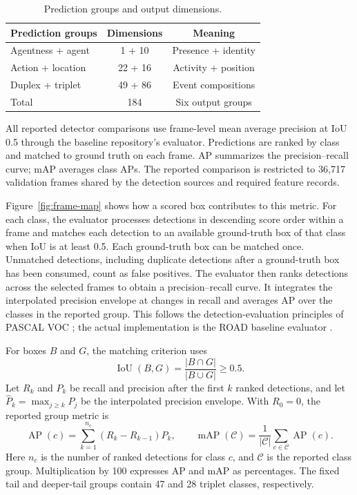 \begin{table}[htbp]
\centering
\caption{Prediction groups and output dimensions.}
\label{tab:2}
\begin{singlespace}
\begin{tabular}{@{}lcc@{}}
\toprule
\textbf{Prediction groups} & \textbf{Dimensions} & \textbf{Meaning} \\
\midrule
Agentness + agent & 1 + 10 & Presence + identity \\
Action + location & 22 + 16 & Activity + position \\
Duplex + triplet & 49 + 86 & Event compositions \\
Total & 184 & Six output groups \\
\bottomrule
\end{tabular}
\end{singlespace}
\end{table}

All reported detector comparisons use frame-level mean average precision at IoU 0.5 through the baseline repository’s evaluator. Predictions are ranked by class and matched to ground truth on each frame. AP summarizes the precision--recall curve; mAP averages class APs. The reported comparison is restricted to 36,717 validation frames shared by the detection sources and required feature records.

Figure~\ref{fig:frame-map} shows how a scored box contributes to this metric. For each class, the evaluator processes detections in descending score order within a frame and matches each detection to an available ground-truth box of that class when IoU is at least 0.5. Each ground-truth box can be matched once. Unmatched detections, including duplicate detections after a ground-truth box has been consumed, count as false positives. The evaluator then ranks detections across the selected frames to obtain a precision--recall curve. It integrates the interpolated precision envelope at changes in recall and averages AP over the classes in the reported group. This follows the detection-evaluation principles of PASCAL VOC \cite{voc}; the actual implementation is the ROAD baseline evaluator \cite{road}.

For boxes \(B\) and \(G\), the matching criterion uses
\begin{equation}\label{eq:iou}
 \operatorname{IoU}(B,G)=\frac{|B\cap G|}{|B\cup G|}\geq 0.5.
\end{equation}
Let \(R_k\) and \(P_k\) be recall and precision after the first \(k\) ranked detections, and let \(\widehat P_k=\max_{j\geq k}P_j\) be the interpolated precision envelope. With \(R_0=0\), the reported group metric is
\begin{equation}\label{eq:ap-map}
 \operatorname{AP}(c)=\sum_{k=1}^{n_c}(R_k-R_{k-1})\widehat P_k,
 \qquad
 \operatorname{mAP}(\mathcal C)=\frac{1}{|\mathcal C|}\sum_{c\in\mathcal C}\operatorname{AP}(c).
\end{equation}
Here \(n_c\) is the number of ranked detections for class \(c\), and \(\mathcal C\) is the reported class group. Multiplication by 100 expresses AP and mAP as percentages. The fixed tail and deeper-tail groups contain 47 and 28 triplet classes, respectively.

